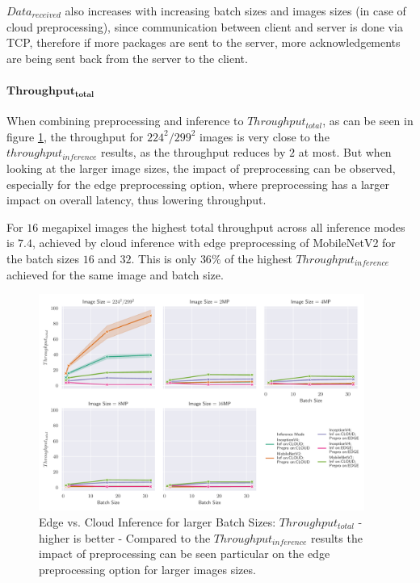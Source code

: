 $Data_{received}$ also increases with increasing batch sizes and images sizes (in case of cloud preprocessing), since communication between client and server is done via TCP, therefore if more packages are sent to the server, more acknowledgements are being sent back from the server to the client.


\paragraph{$\mathbf{Throughput_{total}}$}
When combining preprocessing and inference to $Throughput_{total}$, as can be seen in figure \ref{fig:BatchSizeTotalThroughput}, the throughput for $224^2/299^2$ images is very close to the $throughput_{inference}$ results, as the throughput reduces by $2$ at most.
But when looking at the larger image sizes, the impact of preprocessing can be observed, especially for the edge preprocessing option, where preprocessing has a larger impact on overall latency, thus lowering throughput.

For $16$ megapixel images the highest total throughput across all inference modes is $7.4$, achieved by cloud inference with edge preprocessing of MobileNetV2 for the batch sizes $16$ and $32$.
This is only $36\%$ of the highest $Throughput_{inference}$ achieved for the same image and batch size.
\begin{figure}[!htb]
\centering
\includegraphics[width=0.95\textwidth]{./Bilder/single_plots/batch_size_plots/Effects_of_Batch_size_Total_Throughput_(Preprocessing_+_Inference).pdf}
\caption[Edge vs. Cloud Inference for larger Batch Sizes:  $Throughput_{total}$ - higher is better]{Edge vs. Cloud Inference for larger Batch Sizes:  $Throughput_{total}$ - higher is better - Compared to the $Throughput_{inference}$ results the impact of preprocessing can be seen particular on the edge preprocessing option for larger images sizes.}
\label{fig:BatchSizeTotalThroughput}
\end{figure}


